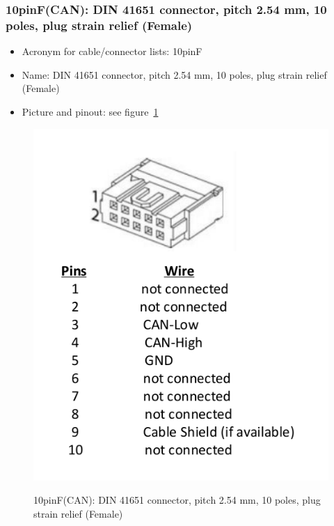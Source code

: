 \subsubsection{10pinF(CAN): DIN 41651 connector, pitch 2.54 mm, 10 poles, plug strain relief (Female)} \label{DEVICE:10pinF(CAN)}
\begin{itemize}
  \item Acronym for cable/connector lists: 10pinF
  \item Name: DIN 41651 connector, pitch 2.54 mm, 10 poles, plug strain relief (Female)
  \item Picture and pinout: see figure~\ref{FIG:DEVICE10pinF(CAN)}
\end{itemize}
\begin{figure}
  \centering
  \includegraphics[angle=90,width=1\columnwidth]{figs/body02/FIGDEVICE10pinF(CAN).pdf}\\
  \caption[10pinF(CAN): DIN 41651 connector, pitch 2.54 mm, 10 poles, plug strain relief (Female)]{10pinF(CAN): DIN 41651 connector, pitch 2.54 mm, 10 poles, plug strain relief (Female)}
  \label{FIG:DEVICE10pinF(CAN)}
\end{figure}
